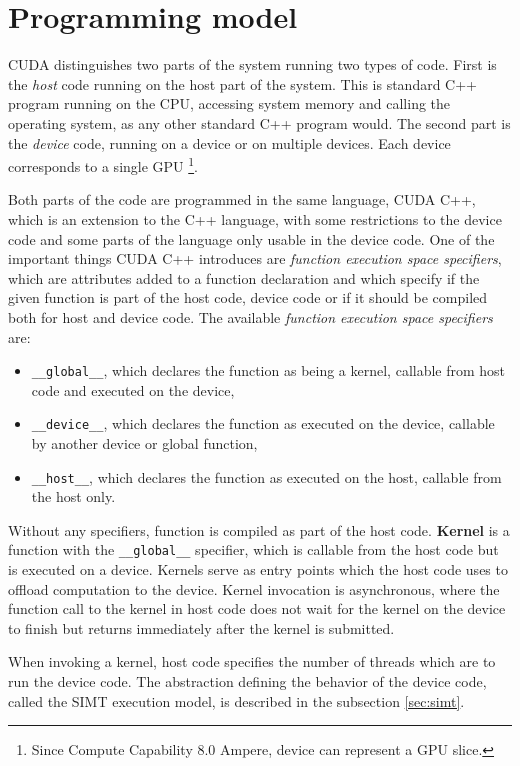 \section{Programming model}
\label{sec:programming_model}

CUDA distinguishes two parts of the system running two types of code. First is the \textit{host} code running on the host part of the system. This is standard C++ program running on the CPU, accessing system memory and calling the operating system, as any other standard C++ program would. The second part is the \textit{device} code, running on a device or on multiple devices. Each device corresponds to a single GPU \footnote{Since Compute Capability 8.0 Ampere, device can represent a GPU slice.}.

Both parts of the code are programmed in the same language, CUDA C++, which is an extension to the C++ language, with some restrictions to the device code and some parts of the language only usable in the device code.
One of the important things CUDA C++ introduces are \textit{function execution space specifiers}, which are attributes added to a function declaration and which specify if the given function is part of the host code, device code or if it should be compiled both for host and device code. The available \textit{function execution space specifiers} are:
\begin{itemize}
	\item \texttt{\_\_global\_\_}, which declares the function as being a kernel, callable from host code and executed on the device,
	\item \texttt{\_\_device\_\_}, which declares the function as executed on the device, callable by another device or global function,
	\item \texttt{\_\_host\_\_}, which declares the function as executed on the host, callable from the host only.
\end{itemize}

Without any specifiers, function is compiled as part of the host code. \textbf{Kernel} is a function with the \texttt{\_\_global\_\_} specifier, which is callable from the host code but is executed on a device. Kernels serve as entry points which the host code uses to offload computation to the device. Kernel invocation is asynchronous, where the function call to the kernel in host code does not wait for the kernel on the device to finish but returns immediately after the kernel is submitted.

When invoking a kernel, host code specifies the number of threads which are to run the device code. The abstraction defining the behavior of the device code, called the SIMT execution model, is described in the subsection \ref{sec:simt}.

